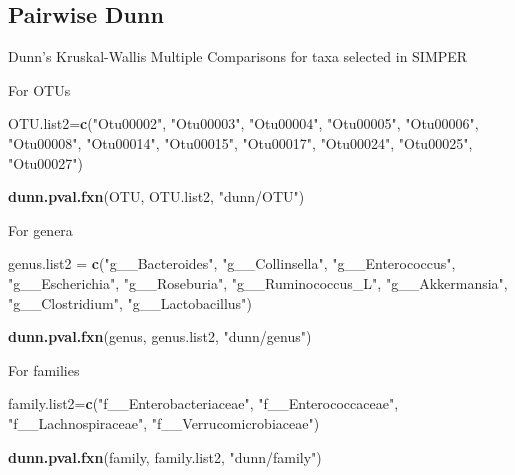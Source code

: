 \documentclass[]{article}
\newenvironment{Shaded}{\begin{snugshade}}{\end{snugshade}}
\newcommand{\KeywordTok}[1]{\textcolor[rgb]{0.13,0.29,0.53}{\textbf{#1}}}
\newcommand{\StringTok}[1]{\textcolor[rgb]{0.31,0.60,0.02}{#1}}
\newcommand{\NormalTok}[1]{#1}
\begin{document}
\subsection{Pairwise Dunn}\label{pairwise-dunn}

Dunn's Kruskal-Wallis Multiple Comparisons for taxa selected in SIMPER

For OTUs

\begin{Shaded}
\begin{Highlighting}[]
\NormalTok{OTU.list2=}\KeywordTok{c}\NormalTok{(}\StringTok{"Otu00002"}\NormalTok{, }\StringTok{"Otu00003"}\NormalTok{, }\StringTok{"Otu00004"}\NormalTok{, }\StringTok{"Otu00005"}\NormalTok{, }\StringTok{"Otu00006"}\NormalTok{, }\StringTok{"Otu00008"}\NormalTok{, }\StringTok{"Otu00014"}\NormalTok{, }\StringTok{"Otu00015"}\NormalTok{, }\StringTok{"Otu00017"}\NormalTok{, }\StringTok{"Otu00024"}\NormalTok{, }\StringTok{"Otu00025"}\NormalTok{, }\StringTok{"Otu00027"}\NormalTok{)}

\KeywordTok{dunn.pval.fxn}\NormalTok{(OTU, OTU.list2, }\StringTok{"dunn/OTU"}\NormalTok{)}
\end{Highlighting}
\end{Shaded}

For genera

\begin{Shaded}
\begin{Highlighting}[]
\NormalTok{genus.list2 =}\StringTok{ }\KeywordTok{c}\NormalTok{(}\StringTok{"g__Bacteroides"}\NormalTok{, }\StringTok{"g__Collinsella"}\NormalTok{, }\StringTok{"g__Enterococcus"}\NormalTok{, }\StringTok{"g__Escherichia"}\NormalTok{, }\StringTok{"g__Roseburia"}\NormalTok{, }\StringTok{"g__Ruminococcus_L"}\NormalTok{, }\StringTok{"g__Akkermansia"}\NormalTok{, }\StringTok{"g__Clostridium"}\NormalTok{, }\StringTok{"g__Lactobacillus"}\NormalTok{)}

\KeywordTok{dunn.pval.fxn}\NormalTok{(genus, genus.list2, }\StringTok{"dunn/genus"}\NormalTok{)}
\end{Highlighting}
\end{Shaded}

For families

\begin{Shaded}
\begin{Highlighting}[]
\NormalTok{family.list2=}\KeywordTok{c}\NormalTok{(}\StringTok{"f__Enterobacteriaceae"}\NormalTok{, }\StringTok{"f__Enterococcaceae"}\NormalTok{, }\StringTok{"f__Lachnospiraceae"}\NormalTok{, }\StringTok{"f__Verrucomicrobiaceae"}\NormalTok{)}

\KeywordTok{dunn.pval.fxn}\NormalTok{(family, family.list2, }\StringTok{"dunn/family"}\NormalTok{)}
\end{Highlighting}
\end{Shaded}
\end{document}
